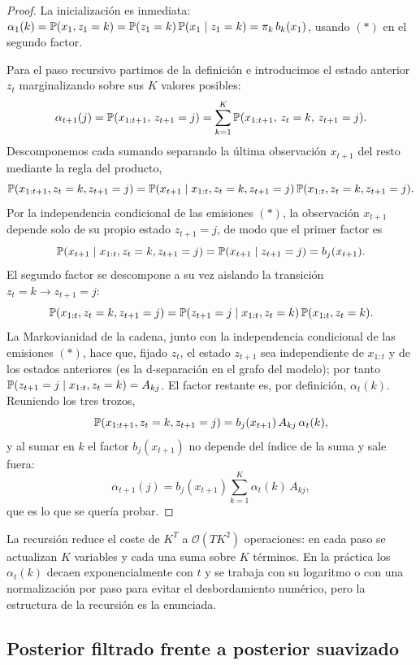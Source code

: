 \begin{proof}
La inicialización es inmediata: $\alpha_1(k) = \mathbb{P}(x_1, z_1 = k) = \mathbb{P}(z_1 = k)\,\mathbb{P}(x_1 \mid z_1 = k) = \pi_k\, b_k(x_1)$, usando $(\ast)$ en el segundo factor.

Para el paso recursivo partimos de la definición e introducimos el estado anterior $z_t$ marginalizando sobre sus $K$ valores posibles:
\[
\alpha_{t+1}(j)
= \mathbb{P}(x_{1:t+1},\, z_{t+1} = j)
= \sum_{k=1}^{K} \mathbb{P}(x_{1:t+1},\, z_t = k,\, z_{t+1} = j).
\]
Descomponemos cada sumando separando la última observación $x_{t+1}$ del resto mediante la regla del producto,
\[
\mathbb{P}(x_{1:t+1}, z_t = k, z_{t+1} = j)
= \mathbb{P}(x_{t+1} \mid x_{1:t}, z_t = k, z_{t+1} = j)\,
  \mathbb{P}(x_{1:t}, z_t = k, z_{t+1} = j).
\]
Por la independencia condicional de las emisiones $(\ast)$, la observación $x_{t+1}$ depende solo de su propio estado $z_{t+1} = j$, de modo que el primer factor es
\[
\mathbb{P}(x_{t+1} \mid x_{1:t}, z_t = k, z_{t+1} = j) = \mathbb{P}(x_{t+1} \mid z_{t+1} = j) = b_j(x_{t+1}).
\]
El segundo factor se descompone a su vez aislando la transición $z_t = k \to z_{t+1} = j$:
\[
\mathbb{P}(x_{1:t}, z_t = k, z_{t+1} = j)
= \mathbb{P}(z_{t+1} = j \mid x_{1:t}, z_t = k)\, \mathbb{P}(x_{1:t}, z_t = k).
\]
La Markovianidad de la cadena, junto con la independencia condicional de las emisiones $(\ast)$, hace que, fijado $z_t$, el estado $z_{t+1}$ sea independiente de $x_{1:t}$ y de los estados anteriores (es la d-separación en el grafo del modelo); por tanto $\mathbb{P}(z_{t+1} = j \mid x_{1:t}, z_t = k) = A_{kj}$. El factor restante es, por definición, $\alpha_t(k)$. Reuniendo los tres trozos,
\[
\mathbb{P}(x_{1:t+1}, z_t = k, z_{t+1} = j) = b_j(x_{t+1})\, A_{kj}\, \alpha_t(k),
\]
y al sumar en $k$ el factor $b_j(x_{t+1})$ no depende del índice de la suma y sale fuera:
\[
\alpha_{t+1}(j) = b_j(x_{t+1}) \sum_{k=1}^{K} \alpha_t(k)\, A_{kj},
\]
que es lo que se quería probar.
\end{proof}

La recursión reduce el coste de $K^T$ a $\mathcal{O}(T K^2)$ operaciones: en cada paso se actualizan $K$ variables y cada una suma sobre $K$ términos. En la práctica los $\alpha_t(k)$ decaen exponencialmente con $t$ y se trabaja con su logaritmo o con una normalización por paso para evitar el desbordamiento numérico, pero la estructura de la recursión es la enunciada.

\subsection{Posterior filtrado frente a posterior suavizado}
\label{sec:hmm-filtrado}


